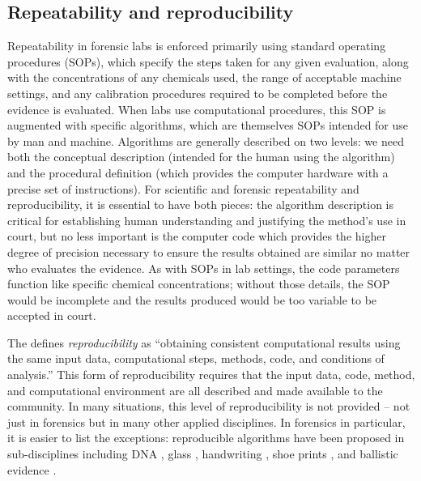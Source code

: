 \documentclass[11pt,]{isuthesis}
\begin{document}
\hypertarget{repeatability-and-reproducibility}{%
\subsection{Repeatability and reproducibility}\label{repeatability-and-reproducibility}}

Repeatability in forensic labs is enforced primarily using standard operating procedures (SOPs), which specify the steps taken for any given evaluation, along with the concentrations of any chemicals used, the range of acceptable machine settings, and any calibration procedures required to be completed before the evidence is evaluated.
When labs use computational procedures, this SOP is augmented with specific algorithms, which are themselves SOPs intended for use by man and machine.
Algorithms are generally described on two levels: we need both the conceptual description (intended for the human using the algorithm) and the procedural definition (which provides the computer hardware with a precise set of instructions).
For scientific and forensic repeatability and reproducibility, it is essential to have both pieces: the algorithm description is critical for establishing human understanding and justifying the method's use in court, but no less important is the computer code which provides the higher degree of precision necessary to ensure the results obtained are similar no matter who evaluates the evidence.
As with SOPs in lab settings, the code parameters function like specific chemical concentrations; without those details, the SOP would be incomplete and the results produced would be too variable to be accepted in court.

The \citet{nasem_2019} defines \emph{reproducibility} as ``obtaining consistent computational results using the same input data, computational steps, methods, code, and conditions of analysis.'' This form of reproducibility requires that the input data, code, method, and computational environment are all described and made available to the community.
In many situations, this level of reproducibility is not provided -- not just in forensics but in many other applied disciplines.
In forensics in particular, it is easier to list the exceptions: reproducible algorithms have been proposed in sub-disciplines including DNA \citep{Tvedebrink2020, osiris, openForSciR}, glass \citep{Curran2000, Park2019}, handwriting \citep{crawford_handwriting_2020}, shoe prints \citep{park_algorithm_2020}, and ballistic evidence \citep{hare_automatic_2016, tai_fully_2018}.
\end{document}
